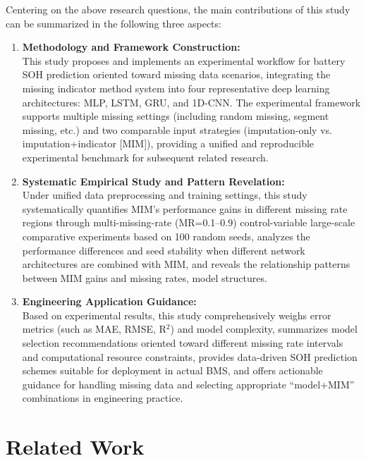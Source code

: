 \documentclass[10pt,a4paper]{article}
\begin{document}
Centering on the above research questions, the main contributions of this study can be summarized in the following three aspects:

\begin{enumerate}[label=(\arabic*)]
    \item \textbf{Methodology and Framework Construction:}\\
    This study proposes and implements an experimental workflow for battery SOH prediction oriented toward missing data scenarios, integrating the missing indicator method system into four representative deep learning architectures: MLP, LSTM, GRU, and 1D-CNN. The experimental framework supports multiple missing settings (including random missing, segment missing, etc.) and two comparable input strategies (imputation-only vs. imputation+indicator [MIM]), providing a unified and reproducible experimental benchmark for subsequent related research.
    
    \item \textbf{Systematic Empirical Study and Pattern Revelation:}\\
    Under unified data preprocessing and training settings, this study systematically quantifies MIM's performance gains in different missing rate regions through multi-missing-rate (MR=0.1--0.9) control-variable large-scale comparative experiments based on 100 random seeds, analyzes the performance differences and seed stability when different network architectures are combined with MIM, and reveals the relationship patterns between MIM gains and missing rates, model structures.
    
    \item \textbf{Engineering Application Guidance:}\\
    Based on experimental results, this study comprehensively weighs error metrics (such as MAE, RMSE, R$^2$) and model complexity, summarizes model selection recommendations oriented toward different missing rate intervals and computational resource constraints, provides data-driven SOH prediction schemes suitable for deployment in actual BMS, and offers actionable guidance for handling missing data and selecting appropriate ``model+MIM'' combinations in engineering practice.
\end{enumerate}

\section{Related Work}\label{sec:related}
\end{document}
